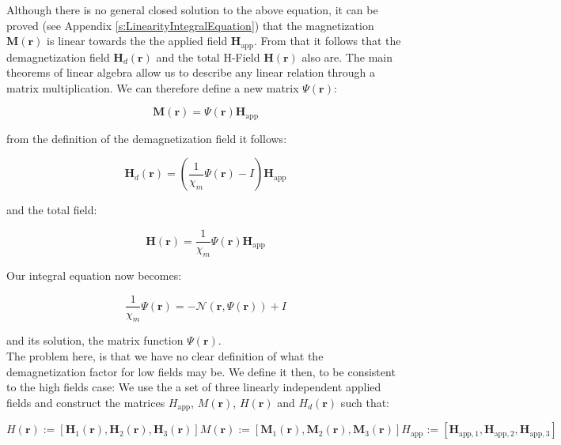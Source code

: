 Although there is no general closed solution to the above equation, it can be proved (see Appendix \ref{s:LinearityIntegralEquation}) that the magnetization $\textbf{M}(\textbf{r})$ is linear towards the the applied field $\textbf{H}_\text{app}$. From that it follows that the demagnetization field  $\textbf{H}_d(\textbf{r})$ and the total H-Field $\textbf{H}(\textbf{r})$ also are. The main theorems of linear algebra allow us to describe any linear relation through a matrix multiplication. We can therefore define a new matrix $\Psi(\textbf{r})$:

\begin{equation}
\textbf{M}(\textbf{r}) = \Psi(\textbf{r})\textbf{H}_\text{app}
\end{equation}

from the definition of the demagnetization field it follows:

\begin{equation}
\textbf{H}_d(\textbf{r}) = \left(\frac{1}{\chi_m}\Psi(\textbf{r})-I\right)\textbf{H}_\text{app}
\end{equation}

and the total field:

\begin{equation}
\textbf{H}(\textbf{r}) = \frac{1}{\chi_m}\Psi(\textbf{r})\textbf{H}_\text{app}
\end{equation}

Our integral equation now becomes:

\begin{equation}
\frac{1}{\chi_m}\Psi(\textbf{r}) = -\mathcal{N}(\textbf{r},\Psi(\textbf{r}))  + I
\end{equation}

and its solution, the matrix function $\Psi(\textbf{r})$.\\

The problem here, is that we have no clear definition of what the demagnetization factor for low fields may be. We define it then, to be consistent to the high fields case: We use the a set of three linearly independent applied fields and construct the matrices $H_\text{app}$, $M(\textbf{r})$, $H(\textbf{r})$ and $H_d(\textbf{r})$ such that:

\begin{subequations}
\begin{equation}
H(\textbf{r}) := [\textbf{H}_1(\textbf{r}), \textbf{H}_2(\textbf{r}), \textbf{H}_3(\textbf{r})]
\end{equation}
\begin{equation}
M(\textbf{r}) := [\textbf{M}_1(\textbf{r}), \textbf{M}_2(\textbf{r}), \textbf{M}_3(\textbf{r})]
\end{equation}
\begin{equation}
H_\text{app} := [\textbf{H}_{\text{app},1}, \textbf{H}_{\text{app},2}, \textbf{H}_{\text{app},3}]
\end{equation}
\end{subequations}

